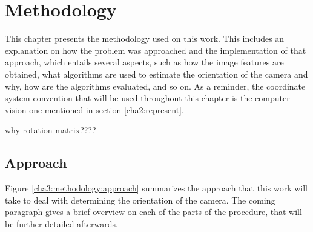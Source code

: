 
\chapter{Methodology}
\label{methodology}

This chapter presents the methodology used on this work. This includes an explanation on how the problem was approached and the implementation of that approach, which entails several aspects, such as how the image features are obtained, what algorithms are used to estimate the orientation of the camera and why, how are the algorithms evaluated, and so on. 
As a reminder, the coordinate system convention that will be used throughout this chapter is the computer vision one mentioned in section \ref{cha2:represent}.

why rotation matrix???? 

\section{Approach}

Figure \ref{cha3:methodology:approach} summarizes the approach that this work will take to deal with determining the orientation of the camera. The coming paragraph gives a brief overview on each of the parts of the procedure, that will be further detailed afterwards.

